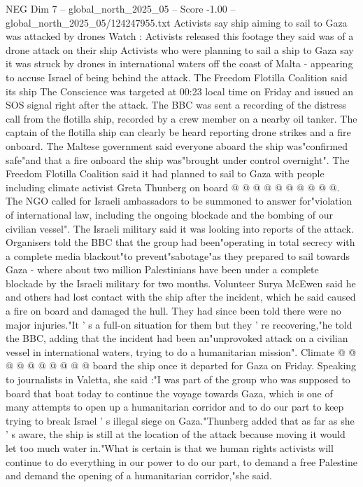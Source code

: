 \begin{textsample}{NEG Dim 7 – global\_north\_2025\_05 – Score -1.00 – global\_north\_2025\_05/124247955.txt}  \label{ex:f7_neg_122}
Activists say ship aiming to sail to Gaza was attacked by drones Watch : Activists released this footage they said was of a drone attack on their ship Activists who were planning to sail a ship to Gaza say it was struck by drones in international waters off the coast of Malta - appearing to accuse Israel of being behind the attack.
The Freedom Flotilla Coalition said its ship The Conscience was targeted at 00:23 local time on Friday and issued an SOS signal right after the attack.
The BBC was sent a recording of the distress call from the flotilla ship, recorded by a crew member on a nearby oil tanker.
The captain of the flotilla ship can clearly be heard reporting drone strikes and a fire onboard.
The Maltese government said everyone aboard the ship was"confirmed safe"and that a fire onboard the ship was"brought under control overnight".
The Freedom Flotilla Coalition said it had planned to sail to Gaza with people including climate activist Greta Thunberg on board @ @ @ @ @ @ @ @ @ @.
The NGO called for Israeli ambassadors to be summoned to answer for"violation of international law, including the ongoing blockade and the bombing of our civilian vessel".
The Israeli military said it was looking into reports of the attack.
Organisers told the BBC that the group had been"operating in total secrecy with a complete media blackout"to prevent"sabotage"as they prepared to sail towards Gaza - where about two million Palestinians have been under a complete blockade by the Israeli military for two months.
Volunteer Surya McEwen said he and others had lost contact with the ship after the incident, which he said caused a fire on board and damaged the hull.
They had since been told there were no major injuries."It ' s a full-on situation for them but they ' re recovering,"he told the BBC, adding that the incident had been an"unprovoked attack on a civilian vessel in international waters, trying to do a humanitarian mission".
Climate @ @ @ @ @ @ @ @ @ @ board the ship once it departed for Gaza on Friday.
Speaking to journalists in Valetta, she said :"I was part of the group who was supposed to board that boat today to continue the voyage towards Gaza, which is one of many attempts to open up a humanitarian corridor and to do our part to keep trying to break Israel ' s illegal siege on Gaza."Thunberg added that as far as she ' s aware, the ship is still at the location of the attack because moving it would let too much water in."What is certain is that we human rights activists will continue to do everything in our power to do our part, to demand a free Palestine and demand the opening of a humanitarian corridor,"she said.

\end{textsample}
